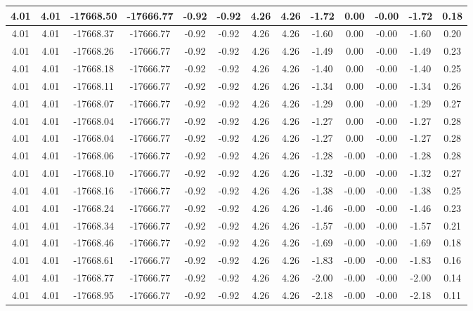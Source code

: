 \begin{table}[htbp]
\begin{adjustbox}{angle=90}
\begin{tabular}{|c|c|c|c|c|c|c|c|c|c|c|c|c|}
 4.01 & 4.01 & -17668.50 & -17666.77 & -0.92 & -0.92 & 4.26 & 4.26 & -1.72 & 0.00 & -0.00 & -1.72 & 0.18\\ \hline
 4.01 & 4.01 & -17668.37 & -17666.77 & -0.92 & -0.92 & 4.26 & 4.26 & -1.60 & 0.00 & -0.00 & -1.60 & 0.20\\ \hline
 4.01 & 4.01 & -17668.26 & -17666.77 & -0.92 & -0.92 & 4.26 & 4.26 & -1.49 & 0.00 & -0.00 & -1.49 & 0.23\\ \hline
 4.01 & 4.01 & -17668.18 & -17666.77 & -0.92 & -0.92 & 4.26 & 4.26 & -1.40 & 0.00 & -0.00 & -1.40 & 0.25\\ \hline
 4.01 & 4.01 & -17668.11 & -17666.77 & -0.92 & -0.92 & 4.26 & 4.26 & -1.34 & 0.00 & -0.00 & -1.34 & 0.26\\ \hline
 4.01 & 4.01 & -17668.07 & -17666.77 & -0.92 & -0.92 & 4.26 & 4.26 & -1.29 & 0.00 & -0.00 & -1.29 & 0.27\\ \hline
 4.01 & 4.01 & -17668.04 & -17666.77 & -0.92 & -0.92 & 4.26 & 4.26 & -1.27 & 0.00 & -0.00 & -1.27 & 0.28\\ \hline
 4.01 & 4.01 & -17668.04 & -17666.77 & -0.92 & -0.92 & 4.26 & 4.26 & -1.27 & 0.00 & -0.00 & -1.27 & 0.28\\ \hline
 4.01 & 4.01 & -17668.06 & -17666.77 & -0.92 & -0.92 & 4.26 & 4.26 & -1.28 & -0.00 & -0.00 & -1.28 & 0.28\\ \hline
 4.01 & 4.01 & -17668.10 & -17666.77 & -0.92 & -0.92 & 4.26 & 4.26 & -1.32 & -0.00 & -0.00 & -1.32 & 0.27\\ \hline
 4.01 & 4.01 & -17668.16 & -17666.77 & -0.92 & -0.92 & 4.26 & 4.26 & -1.38 & -0.00 & -0.00 & -1.38 & 0.25\\ \hline
 4.01 & 4.01 & -17668.24 & -17666.77 & -0.92 & -0.92 & 4.26 & 4.26 & -1.46 & -0.00 & -0.00 & -1.46 & 0.23\\ \hline
 4.01 & 4.01 & -17668.34 & -17666.77 & -0.92 & -0.92 & 4.26 & 4.26 & -1.57 & -0.00 & -0.00 & -1.57 & 0.21\\ \hline
 4.01 & 4.01 & -17668.46 & -17666.77 & -0.92 & -0.92 & 4.26 & 4.26 & -1.69 & -0.00 & -0.00 & -1.69 & 0.18\\ \hline
 4.01 & 4.01 & -17668.61 & -17666.77 & -0.92 & -0.92 & 4.26 & 4.26 & -1.83 & -0.00 & -0.00 & -1.83 & 0.16\\ \hline
 4.01 & 4.01 & -17668.77 & -17666.77 & -0.92 & -0.92 & 4.26 & 4.26 & -2.00 & -0.00 & -0.00 & -2.00 & 0.14\\ \hline
 4.01 & 4.01 & -17668.95 & -17666.77 & -0.92 & -0.92 & 4.26 & 4.26 & -2.18 & -0.00 & -0.00 & -2.18 & 0.11\\ \hline

\end{tabular}
\end{adjustbox}
\end{table}
